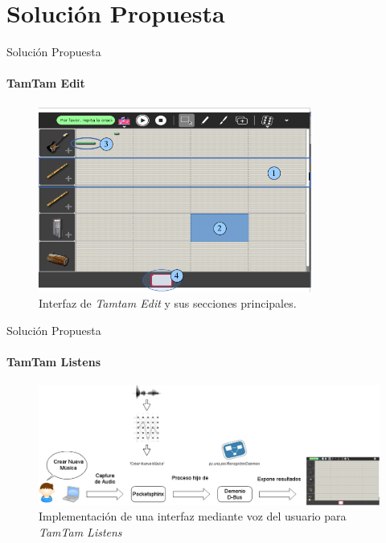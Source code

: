 \section{Soluci\'on Propuesta}

\begin{frame}{Soluci\'on Propuesta}
\framesubtitle{TamTam Edit}

\begin{figure}[H]
\centering
\includegraphics[width=0.8\textwidth]{./graphics/ui-tamtam-edit.png}
\caption{Interfaz de \emph{Tamtam Edit} y sus secciones principales.}
\label{figure:ui-tamtam}
\end{figure}

\end{frame}

\begin{frame}{Soluci\'on Propuesta}
\framesubtitle{TamTam Listens}

\begin{figure}[H] 
\centering
\includegraphics[width=1.0\textwidth]{./graphics/tamtam-proceso.png}
\caption{Implementación de una interfaz mediante voz del usuario para \emph{TamTam Listens}}
\label{figure:tamtam-listens-proceso}
\end{figure}

\end{frame}


